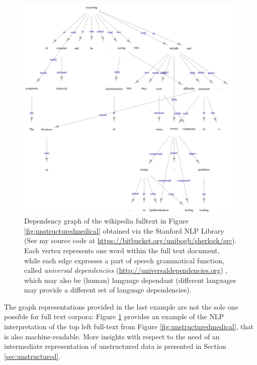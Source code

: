 \begin{figure}
\hspace*{-2cm}
  \includegraphics[width=1.3\textwidth]{fig/01dataint/recurringgrapj.pdf}
  \caption{Dependency graph of the wikipedia fulltext in Figure \ref{fig:unstructuredmedical} obtained via the Stanford NLP Library (See my source code at \url{https://bitbucket.org/unibogb/sherlock/src}). Each vertex represents one word within the full text document, while each edge expresses a part of speech grammatical function, called \textit{universal dependencies} (\url{http://universaldependencies.org}) \cite{MarneffeDSHGNM14}, which may also be (human) language dependant (different languages may provide a different set of language dependencies).}
  \label{fig:dependencygraphexample}
\end{figure}

The graph representations provided in the last example are not the sole one possible for full text corpora: Figure \ref{fig:dependencygraphexample} provides an example of the NLP interpretation of the top left full-text from Figure \ref{fig:unstructuredmedical}, that is also machine-readable. More insights with respect to the need of an intermediate representation of unstructured data is presented in Section \vref{sec:unstructured}. 




